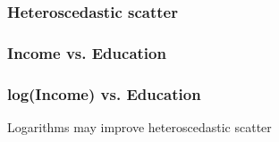 \documentclass[handout]{beamer}
\begin{document}


   \begin{frame}
   \frametitle{Heteroscedastic scatter}
   \begin{center}
   \end{center}

   \end{frame}



   \begin{frame}
   \frametitle{Income vs. Education}
   \begin{center}
   \end{center}

   \end{frame}



   \begin{frame}
   \frametitle{log(Income) vs. Education}
   \begin{center}
   \end{center}
   Logarithms may improve heteroscedastic scatter
   \end{frame}
\end{document}
